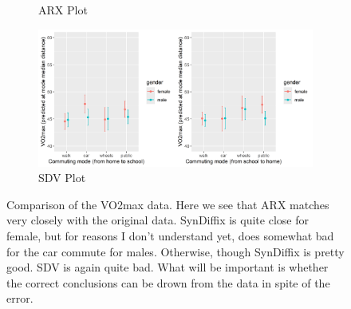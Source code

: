 \begin{figure}[htbp]
\begin{subfigure}[b]{0.48\textwidth}
            \caption{ARX Plot}
            \label{fig:r_arx_plot}
        \end{subfigure}
        \hspace{0.0\textwidth}
        \begin{subfigure}[b]{0.48\textwidth}
            \centering
            \includegraphics[width=\textwidth]{figs/r_sdv_plot.png}
            \caption{SDV Plot}
            \label{fig:r_sdv_plot}
        \end{subfigure}
        \caption{Comparison of the VO2max data. Here we see that ARX matches very closely with the original data. SynDiffix is quite close for female, but for reasons I don't understand yet, does somewhat bad for the car commute for males. Otherwise, though SynDiffix is pretty good. SDV is again quite bad. What will be important is whether the correct conclusions can be drown from the data in spite of the error.
        }
        \label{fig:comparison_plots}
    \end{figure}

    